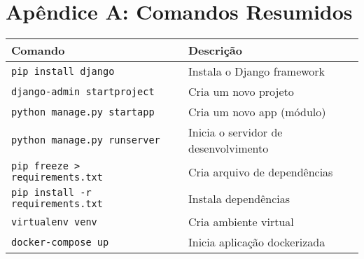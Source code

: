 \chapter*{Ap\^endice A: Comandos Resumidos}
\begin{tabular}{|l|p{10cm}|}
\hline
Comando & Descri\c{c}\~ao \\
\hline
\texttt{pip install django} & Instala o Django framework \\
\texttt{django-admin startproject} & Cria um novo projeto \\
\texttt{python manage.py startapp} & Cria um novo app (m\'odulo) \\
\texttt{python manage.py runserver} & Inicia o servidor de desenvolvimento \\
\texttt{pip freeze > requirements.txt} & Cria arquivo de depend\^encias \\
\texttt{pip install -r requirements.txt} & Instala depend\^encias \\
\texttt{virtualenv venv} & Cria ambiente virtual \\
\texttt{docker-compose up} & Inicia aplica\c{c}\~ao dockerizada \\
\hline
\end{tabular}